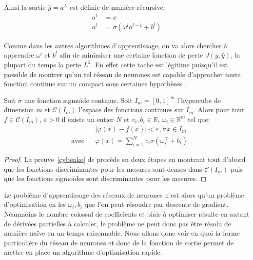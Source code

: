 Ainsi la sortie $\hat{y} = a^L$ est définie de manière récursive:
\begin{align*}
    a^1 &= x \\
    a^l &= \sigma(\omega^l a^{l-1} + b^l )
\end{align*}


Comme dans les autres algorithmes d'apprentissage, on va alors chercher à apprendre $\omega^l$ et $b^l$ afin de minimiser une certaine fonction de perte $J (y,\hat{y})$, la plupart du temps la perte $L^2$. En effet cette tache est légitime puisqu'il est possible de montrer qu'un tel réseau de neurones est capable d'approcher toute fonction continue sur un compact sous certaines hypothèses \citep{Hornik1991}.

\begin{theoreme}
    Soit $\sigma$ une fonction sigmoïde continue. Soit $I_m = [0,1]^m$ l'hypercube de dimension $m$ et $\mathcal{C} (I_m)$ l'espace des fonctions continues sur $I_m$. Alors pour tout $f \in \mathcal{C} (I_m)$, $\varepsilon > 0$ il existe un entier $N$ et $v_i, b_i \in \mathbb{R}$, $\omega_i \in \mathbb{R}^m$ tel que:
    \begin{equation*}
    \begin{aligned}
        & & & \vert \varphi(x) - f(x)  \vert < \varepsilon , \forall x \in I_m \\
        & \text{avec}
        & & \varphi(x) = \sum_{i=1}^N v_i \sigma ( \omega_i^\intercal + b_i )
    \end{aligned}
    \end{equation*}
\end{theoreme}

\begin{proof}
    La preuve~\ref{cybenko} de \citet{Cybenko} procède en deux étapes en montrant tout d'abord que les fonctions discriminantes pour les mesures sont denses dans $\mathcal{C} (I_m)$ puis que les fonctions sigmoïdes sont discriminantes pour les mesures.
\end{proof}

Le problème d'apprentissage des réseaux de neurones n'est alors qu'un problème d'optimisation en les $\omega_i, b_i$ que l'on peut résoudre par descente de gradient. Néanmoins le nombre colossal de coefficients et biais à optimiser résulte en autant de dérivées partielles à calculer, le problème ne peut donc pas être résolu de manière naïve en un temps raisonnable. Nous allons donc voir en quoi la forme particulière du réseau de neurones et donc de la fonction de sortie permet de mettre en place un algorithme d'optimisation rapide.

